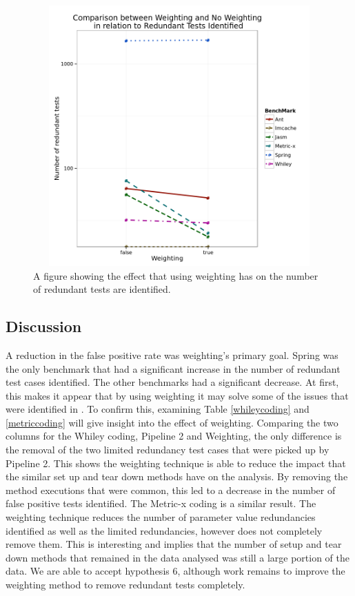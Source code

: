 \documentclass[11pt
              , a4paper
              , twoside
              , openright
              ]{report}
\begin{document}
\begin{figure}[h]
\begin{center}
\includegraphics[height=10cm, width = 14.5cm]{Weighting.png}
\end{center}
\caption{A figure showing the effect that using weighting has on the number of redundant tests are identified.}
\label{fig:weightgraph}
\end{figure}

\subsection{Discussion}
A reduction in the false positive rate was weighting's primary goal. Spring was the only benchmark that had a significant increase in the number of redundant test cases identified. The other benchmarks had a significant decrease. At first, this makes it appear that by using weighting it may solve some of the issues that were identified in \cite{koochakzadeh2009test} \cite{li2008static}. To confirm this, examining Table \ref{whileycoding} and \ref{metriccoding} will give insight into the effect of weighting. Comparing the two columns for the Whiley coding, Pipeline 2 and Weighting, the only difference is the removal of the two limited redundancy test cases that were picked up by Pipeline 2. This shows the weighting technique is able to reduce the impact that the similar set up and tear down methods have on the analysis. By removing the method executions that were common, this led to a decrease in the number of false positive tests identified. The Metric-x coding is a similar result. The weighting technique reduces the number of parameter value redundancies identified as well as the limited redundancies, however does not completely remove them. This is interesting and implies that the number of setup and tear down methods that remained in the data analysed was still a large portion of the data. We are able to accept hypothesis 6, although work remains to improve the weighting method to remove redundant tests completely.
\end{document}
